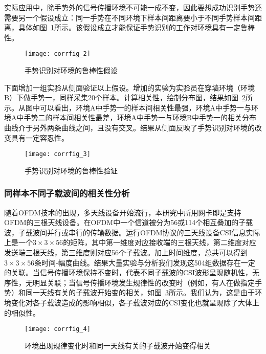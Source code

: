 实际应用中，除手势外的信号传播环境不可能一成不变，因此要想成功识别手势还需要另一个假设成立：同一手势在不同环境下样本间距离要小于不同手势样本间距离，具体如图~\ref{fig:corrfig_2}所示。该假设成立才能保证手势识别的工作对环境具有一定鲁棒性。

\begin{figure}[htbp]
\centering
\texttt{[image: corrfig\_2]}
\caption{手势识别对环境的鲁棒性假设}
\label{fig:corrfig_2}
\end{figure}

下面增加一组实验从侧面验证以上假设。增加的实验为实验员在穿墙环境（环境B）下做手势一，同样采集20个样本。计算相关性，绘制分布图，结果如图~\ref{fig:corrfig_3}所示。从图中可以看出，环境A中手势一的样本间相关性最强，环境A中手势一与环境A中手势二的样本间相关性最差，环境A中手势一与环境B中手势一的相关分布曲线介于另外两条曲线之间，且没有交叉。结果从侧面反映了手势识别对环境的改变具有一定容忍性。

\begin{figure}[htbp] %
  \centering
  \texttt{[image: corrfig\_3]}
  \caption{手势识别对环境的鲁棒性验证}
  \label{fig:corrfig_3}
\end{figure}

\subsubsection{同样本不同子载波间的相关性分析}

随着OFDM技术的出现，多天线设备开始流行，本研究中所用网卡即是支持OFDM的三根天线设备。在OFDM中一个信道被分为56或114个相互叠加的子载波，子载波间并行或串行的传输数据。运行OFDM协议的三天线设备CSI信息实际上是一个$3 \times 3 \times 56$的矩阵，其中第一维度对应接收端的三根天线，第二维度对应发送端三根天线，第三维度则对应56个子载波。加上时间维度，总共可以得到$3 \times 3 \times 56$条时间-幅度曲线。结果大量实验与分析我们发现这504组数据存在一定的关联。当信号传播环境保持不变时，代表不同子载波的CSI波形呈现随机性，无序性，无明显关联；当信号传播环境发生规律性的改变时（例如，有人在做指定手势）和同一天线有关的子载波开始变的相关，如图~\ref{fig:corrfig_4}所示。我们认为，这是由于环境变化对各子载波造成的影响相似，各子载波对应的CSI变化也就呈现除了大体上的相似性。

\begin{figure}[htbp] %
  \centering
  \texttt{[image: corrfig\_4]}
  \caption[环境规律变化对子载波的影响]{环境出现规律变化时和同一天线有关的子载波开始变得相关}
  \label{fig:corrfig_4}
\end{figure}

